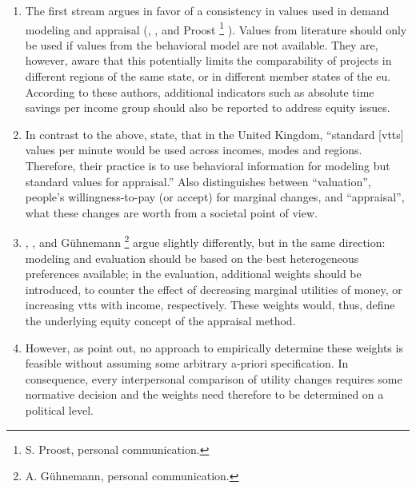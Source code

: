 \begin{enumerate}\styleEnumerate
%
\item The first stream argues in favor of a consistency in values used in demand modeling and appraisal 
(\citet[p.255]{Grant-MullerEtAl2001EconomicTransportAppraisalRevisited}, \citet[p.S4 and p.S8]{HEATCO2006Delivrable5}, and Proost%
%
\footnote{
%
S. Proost, personal communication.
%
}%
%
). Values from literature should only be used if values from the behavioral model are not available. They are, however, aware that this potentially limits the comparability of projects in different regions of the same state, or in different member states of the \gls{eu}.
%
According to these authors, additional indicators such as absolute time savings per income group should also be reported to address equity issues.
%
\item In contrast to the above, \citet[p.12]{MackieWorsley2013ComparisonTransportAppraisal} state, that in the United Kingdom, \enquote{standard [\gls{vtts}] values per minute would be used across incomes, modes and regions. Therefore, their practice is to use behavioral information for modeling but standard values for appraisal.} Also \citet{Daly2013hEARTKeynote} distinguishes between ``valuation'', \ie people's willingness-to-pay (or accept) for marginal changes, and ``appraisal'', \ie what these changes are worth from a societal point of view.
%
\item \label{lbl:weights} \citet{Fowkes2010ValueOfTTS}, \citet{OECD2006CBA}, and G\"uhnemann%
%
\footnote{
%
A. G\"uhnemann, personal communication.
%
}
%
argue slightly differently, but in the same direction: modeling and evaluation should be based on the best heterogeneous preferences available; in the evaluation, additional weights should be introduced, \eg to counter the effect of decreasing marginal utilities of money, or increasing \gls{vtts} with income, respectively. These weights would, thus, define the underlying equity concept of the appraisal method.
%
\item However, as \citet{AhlheimRose1989MessungIndividuellerWohlfahrt} point out, no approach to empirically determine these weights is feasible without assuming some arbitrary a-priori specification.
%
%
%
In consequence, every interpersonal comparison of utility changes requires some normative decision and the weights need therefore to be determined on a political level.
%
\end{enumerate}


